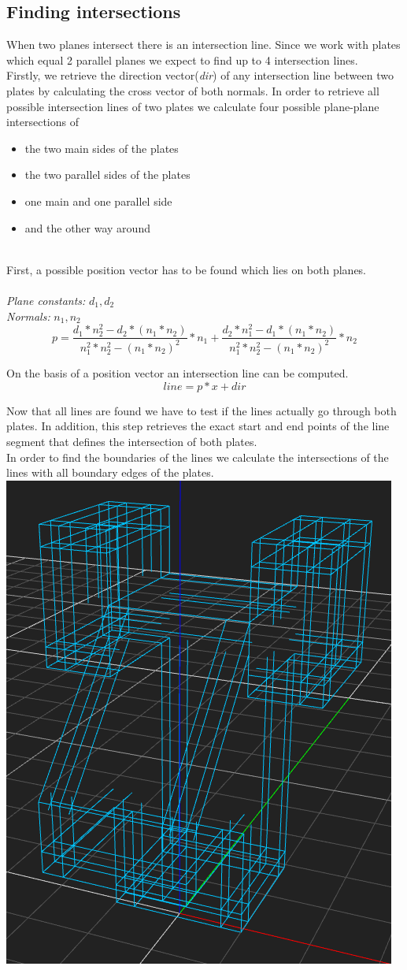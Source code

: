 \documentclass[../ClassicThesis.tex]{subfiles}
\begin{document}
\subsection{Finding intersections}
When two planes intersect there is an intersection line. Since we work with plates which equal 2 parallel planes we expect to find up to 4 intersection lines.\\
Firstly, we retrieve the direction vector(\emph{dir}) of any intersection line between two plates by calculating the cross vector of both normals.
In order to retrieve all possible intersection lines of two plates we calculate four possible plane-plane intersections \cite{planePlaneIntersection} of 
\begin{itemize}
\item the two main sides of the plates
\item the two parallel sides of the plates
\item one main and one parallel side 
\item and the other way around
\end{itemize}
\*\\
First, a possible position vector has to be found which lies on both planes.
\\\*\\
\emph{Plane constants:} $d_1, d_2$\\
\emph{Normals:} $n_1, n_2$
$$ p = \frac{d_1 * n_{2}^{2} - d_2 * (n_1 * n_2)}{n_{1}^{2} * n_{2}^{2} - (n_1 * n_2)^{2}} * n_1 + \frac{d_2*n_1^2 - d_1*(n_1 * n_2)}{n_1^2 * n_2^2 - (n_1 * n_2)^2} * n_2 $$

On the basis of a position vector an intersection line can be computed.
$$ line = p*x + dir$$

Now that all lines are found we have to test if the lines actually go through both plates.  In addition, this step retrieves the exact start and end points of the line segment that defines the intersection of both plates.\\
In order to find the boundaries of the lines we calculate the intersections of the lines with all boundary edges of the plates.\\
\includegraphics[width=.5\columnwidth]{Images/HeadAllBoundaries.png}
\end{document}
